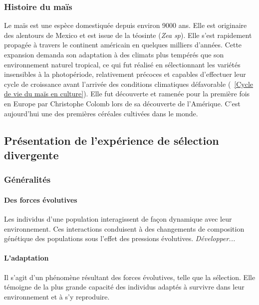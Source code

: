 \documentclass[12pt,a4paper]{article}
\begin{document}
			\subsubsection{Histoire du maïs}
			\label{histoire_mais}
				Le maïs est une espèce domestiquée depuis environ 9000 ans. Elle est originaire des alentours de Mexico et est issue de la téosinte (\textit{Zea sp}). Elle s'est rapidement propagée à travers le continent américain\cite{tenaillon} en quelques milliers d'années. Cette expansion demanda son adaptation à des climats plus tempérés que son environnement naturel tropical, ce qui fut réalisé en sélectionnant les variétés insensibles à la photopériode, relativement précoces et capables d'effectuer leur cycle de croissance avant l'arrivée des conditions climatiques défavorable (~\ref{Cycle de vie du maïs en culture}). Elle fut découverte et ramenée pour la première fois en Europe par Christophe Colomb lors de sa découverte de l'Amérique. C'est aujourd'hui une des premières céréales cultivées dans le monde.
				
				
		\subsection{Présentation de l'expérience de sélection divergente}
		
			\subsubsection{Généralités}
				
				\paragraph{Des forces évolutives}
				
					Les individus d'une population interagissent de façon dynamique avec leur environnement. Ces interactions conduisent à des changements de composition génétique des populations sous l'effet des pressions évolutives. \textit{Développer...}
					
				\paragraph{L'adaptation}
				
					Il s'agit d'un phénomène résultant des forces évolutives, telle que la sélection. Elle témoigne de la plus grande capacité des individus adaptés à survivre dans leur environnement et à s'y reproduire.
			
\end{document}
